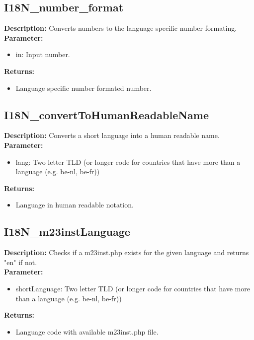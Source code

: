 \subsection{I18N\_number\_format}
\textbf{Description:} Converts numbers to the language specific number formating.\\
\textbf{Parameter:}
\begin{itemize}
\item in: Input number.
\end{itemize}
\textbf{Returns:}
\begin{itemize}
\item Language specific number formated number.
\end{itemize}

\subsection{I18N\_convertToHumanReadableName}
\textbf{Description:} Converts a short language into a human readable name.\\
\textbf{Parameter:}
\begin{itemize}
\item lang: Two letter TLD (or longer code for countries that have more than a language (e.g. be-nl, be-fr))
\end{itemize}
\textbf{Returns:}
\begin{itemize}
\item Language in human readable notation.
\end{itemize}

\subsection{I18N\_m23instLanguage}
\textbf{Description:} Checks if a m23inst.php exists for the given language and returns "en" if not.\\
\textbf{Parameter:}
\begin{itemize}
\item shortLanguage: Two letter TLD (or longer code for countries that have more than a language (e.g. be-nl, be-fr))
\end{itemize}
\textbf{Returns:}
\begin{itemize}
\item Language code with available m23inst.php file.
\end{itemize}

